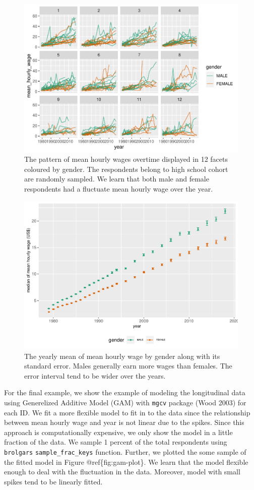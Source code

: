 \documentclass{article}
\begin{document}
\begin{figure}
\centering
\includegraphics{figures/gender-plot-1.pdf}
\caption{The pattern of mean hourly wages overtime displayed in 12 facets coloured by gender. The respondents belong to high school cohort are randomly sampled. We learn that both male and female respondents had a fluctuate mean hourly wage over the year.}
\end{figure}

\begin{figure}
\centering
\includegraphics{figures/gender-se-1.pdf}
\caption{The yearly mean of mean hourly wage by gender along with its standard error. Males generally earn more wages than females. The error interval tend to be wider over the years.}
\end{figure}

For the final example, we show the example of modeling the longitudinal data using Generelized Additive Model (GAM) with \texttt{mgcv} package (Wood 2003) for each ID. We fit a more flexible model to fit in to the data since the relationship between mean hourly wage and year is not linear due to the spikes. Since this approach is computationally expensive, we only show the model in a little fraction of the data. We sample 1 percent of the total respondents using \texttt{brolgar\textquotesingle{}s} \texttt{sample\_frac\_keys} function. Further, we plotted the some sample of the fitted model in Figure @ref\{fig:gam-plot\}. We learn that the model flexible enough to deal with the fluctuation in the data. Moreover, model with small spikes tend to be linearly fitted.
\end{document}
